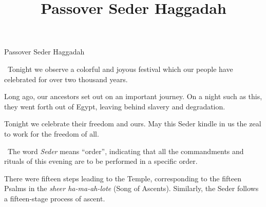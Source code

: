 \documentclass[12pt]{article}
\title{Passover Seder Haggadah}
\makeatletter
\newcommand{\god}{God}
\newcommand{\hebrewInline}[1]{\mbox{\cjRL{\large #1}}}
\newcommand{\stepKadaeshEn}{Kadaesh}
\newcommand{\stepKadaeshHe}{qade+s}
\newcommand{\stepOorchahtzEn}{Oorchahtz}
\newcommand{\stepOorchahtzHe}{Ur:.ha.s}
\newcommand{\stepKarpahsEn}{Karpahs}
\newcommand{\stepKarpahsHe}{k*ar:p*as}
\newcommand{\stepYachatzEn}{Yachatz}
\newcommand{\stepYachatzHe}{ya.ha.s}
\newcommand{\stepMaggeedEn}{Maggeed}
\newcommand{\stepMaggeedHe}{mag*iyd}
\newcommand{\stepRachtzahEn}{Rachtzah}
\newcommand{\stepRachtzahHe}{rA.ha:.sAh}
\newcommand{\stepMoatzeeEn}{Moatzee}
\newcommand{\stepMoatzeeHe}{mO.siy'}
\newcommand{\stepMatzahEn}{Matzah}
\newcommand{\stepMatzahHe}{ma.s*Ah}
\newcommand{\stepMaroarEn}{Ma-roar}
\newcommand{\stepMaroarHe}{mArOr}
\newcommand{\stepKoraechEn}{Kor-aech}
\newcommand{\stepKoraechHe}{k*Orek:}
\newcommand{\stepShoolchanOraechEn}{Shoolchan Or-aech}
\newcommand{\stepShoolchanOraechHe}{+sul:.hAn `Orek:}
\newcommand{\stepTzafoonEn}{Tzafoon}
\newcommand{\stepTzafoonHe}{.sApUn}
\newcommand{\stepBaraechEn}{Bar-aech}
\newcommand{\stepBaraechHe}{b*Arek:}
\newcommand{\stepHalailEn}{Halail}
\newcommand{\stepHalailHe}{hal*el}
\newcommand{\stepNeartzahEn}{Near-tzah}
\newcommand{\stepNeartzahHe}{nir:.sAh}
\newcommand{\sederStep}[3]{
            \begin{tabular}{ll}
                \begin{tabular}[t]{@{}l@{}}\textbf{\hebrewInline{#2}}\\\textbf{\textit{#1}}\end{tabular} &
                    \begin{minipage}[t]{0.35\textwidth}
                        #3
                    \end{minipage}
            \end{tabular}
            \\[0.8em]
}
\newcommand{\newReading}{\faBook{}\ }
\makeatother
\begin{document}
\begin{center}
{\Huge Passover Seder Haggadah}

\end{center}




\newReading Tonight we observe a colorful and joyous festival which our people have celebrated for over two thousand years.

Long ago, our ancestors set out on an important journey. On a night such as this, they went forth out of Egypt, leaving behind slavery and degradation.

Tonight we celebrate their freedom and ours. May this Seder kindle in us the zeal to work for the freedom of all.
\wineIntro{}

\newReading The word \textit{Seder} means ``order'', indicating that all the commandments and rituals of this evening are to be performed in a specific order.

There were fifteen steps leading to the Temple, corresponding to the fifteen Psalms in the \hebrewInline{+siyr ham*a`a:lOt} \textit{sheer ha-ma-ah-lote} (Song of Ascents). Similarly, the Seder follows a fifteen-stage process of ascent.

\end{document}
